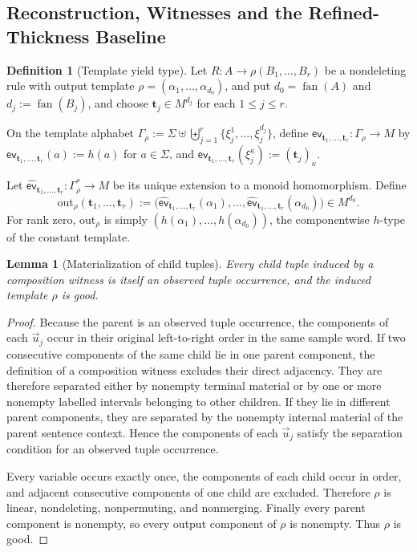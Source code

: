\documentclass[11pt]{article}
\numberwithin{equation}{section}
\theoremstyle{plain}
\newtheorem{lemma}[theorem]{Lemma}
\theoremstyle{definition}
\newtheorem{definition}[theorem]{Definition}
\theoremstyle{remark}
\newcommand{\out}{\mathrm{out}}
\newcommand{\tuple}[1]{\vec{#1}}
\newcommand{\fan}{\operatorname{fan}}
\newcommand{\evalmap}{\mathsf{ev}}
\theoremstyle{plain}
\begin{document}
\subsection{Reconstruction, Witnesses and the Refined-Thickness Baseline}
\label{subsec:p3-v82-reconstruction}

\begin{definition}[Template yield type]
\label{def:output-map}
Let
\(R:A\to\rho(B_1,\ldots,B_r)\)
be a nondeleting rule with output template
\(\rho=(\alpha_1,\ldots,\alpha_{d_0})\), and put \(d_0=\fan(A)\) and
\(d_j:=\fan(B_j)\), and choose
\(\mathbf t_j\in M^{d_j}\) for each \(1\le j\le r\).

On the template alphabet
\(
  \Gamma_\rho
  :=\Sigma\uplus\biguplus_{j=1}^r
  \{\xi_j^1,\ldots,\xi_j^{d_j}\}
\),
define
\(\evalmap_{\mathbf t_1,\ldots,\mathbf t_r}\colon\Gamma_\rho\to M\)
by
\(\evalmap_{\mathbf t_1,\ldots,\mathbf t_r}(a):=h(a)\)
for \(a\in\Sigma\), and
\(\evalmap_{\mathbf t_1,\ldots,\mathbf t_r}(\xi_j^{\kappa}):=(\mathbf t_j)_\kappa\).

Let
\(
  \widehat{\evalmap}_{\mathbf t_1,\ldots,\mathbf t_r}
  \colon\Gamma_\rho^*\to M
\)
be its unique extension to a monoid homomorphism.
Define
\[
  \out_\rho(\mathbf t_1,\ldots,\mathbf t_r)
  :=
  \bigl(
    \widehat{\evalmap}_{\mathbf t_1,\ldots,\mathbf t_r}(\alpha_1),
    \ldots,
    \widehat{\evalmap}_{\mathbf t_1,\ldots,\mathbf t_r}(\alpha_{d_0})
  \bigr)
\in M^{d_0}.
\]
For rank zero, \(\out_\rho\) is simply
\((h(\alpha_1),\ldots,h(\alpha_{d_0}))\), the componentwise \(h\)-type of the
constant template.
\end{definition}

\begin{lemma}[Materialization of child tuples]
\label{lem:composition-witness-materialization}
Every child tuple induced by a composition witness is itself an observed tuple
occurrence, and the induced template $\rho$ is good.
\end{lemma}
\begin{proof}
Because the parent is an observed tuple occurrence, the components of each
$\tuple u_j$ occur in their original left-to-right order in the same sample
word.  If two consecutive components of the same child lie in one parent
component, the definition of a composition witness excludes their direct
adjacency.  They are therefore separated either by nonempty terminal material
or by one or more nonempty labelled intervals belonging to other children.
If they lie in different parent components, they are separated by the
nonempty internal material of the parent sentence context.  Hence the
components of each $\tuple u_j$ satisfy the separation condition for an
observed tuple occurrence.

Every variable occurs exactly once, the components of each child occur in
order, and adjacent consecutive components of one child are excluded.
Therefore $\rho$ is linear, nondeleting, nonpermuting, and nonmerging.
Finally every parent component is nonempty, so every output component of
$\rho$ is nonempty.  Thus $\rho$ is good.
\end{proof}
\end{document}
